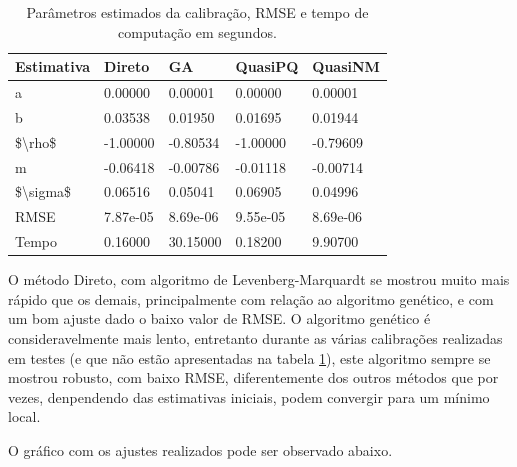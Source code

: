 \documentclass[]{book}
\theoremstyle{definition}
\theoremstyle{definition}
\theoremstyle{definition}
\theoremstyle{remark}
\begin{document}
\begin{table}[t]

\caption{\label{tab:tabela}Parâmetros estimados da calibração, RMSE e tempo de computação em segundos.}
\centering
\fontsize{18}{20}\selectfont
\begin{tabular}{lllll}
\toprule
Estimativa & Direto & GA & QuasiPQ & QuasiNM\\
\midrule
a & 0.00000 & 0.00001 & 0.00000 & 0.00001\\
b & 0.03538 & 0.01950 & 0.01695 & 0.01944\\
\$\textbackslash{}rho\$ & -1.00000 & -0.80534 & -1.00000 & -0.79609\\
m & -0.06418 & -0.00786 & -0.01118 & -0.00714\\
\$\textbackslash{}sigma\$ & 0.06516 & 0.05041 & 0.06905 & 0.04996\\
\addlinespace
RMSE & 7.87e-05 & 8.69e-06 & 9.55e-05 & 8.69e-06\\
Tempo & 0.16000 & 30.15000 & 0.18200 & 9.90700\\
\bottomrule
\end{tabular}
\end{table}

O método Direto, com algoritmo de Levenberg-Marquardt se mostrou muito
mais rápido que os demais, principalmente com relação ao algoritmo
genético, e com um bom ajuste dado o baixo valor de RMSE. O algoritmo
genético é consideravelmente mais lento, entretanto durante as várias
calibrações realizadas em testes (e que não estão apresentadas na tabela
\ref{tab:tabela}), este algoritmo sempre se mostrou robusto, com baixo
RMSE, diferentemente dos outros métodos que por vezes, denpendendo das
estimativas iniciais, podem convergir para um mínimo local.

O gráfico com os ajustes realizados pode ser observado abaixo.
\end{document}
